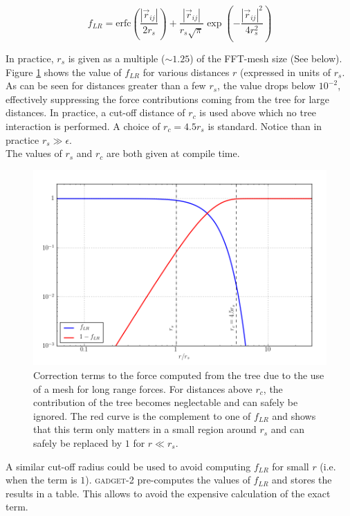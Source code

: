 \documentclass[a4paper,10pt]{report}
\newcommand{\gadget}{\textsc{gadget-2 }}
\begin{document}
\begin{equation}
 f_{LR} = \text{erfc}\left(\frac{|\vec{r}_{ij}|}{2r_s}\right) + \frac{|\vec{r}_{ij}|}{r_s\sqrt{\pi}}\exp\left(-\frac{|\vec{r}_{ij}|^2}{4r_s^2}\right)
\end{equation}

In practice, $r_s$ is given as a multiple ($\sim 1.25$) of the FFT-mesh size (See below). Figure \ref{fig:short_range_correction} shows the value of $f_{LR}$ for various distances $r$ (expressed in units of $r_s$.
As can be seen for distances greater than a few $r_s$, the value drops below $10^{-2}$, effectively suppressing the force contributions coming from the tree for large distances. In practice, a
cut-off distance of $r_c$ is used above which no tree interaction is performed. A choice of $r_c=4.5r_s$ is standard. Notice than in practice $r_s \gg \epsilon$.\\
The values of $r_s$ and $r_c$ are both given at compile time. \\

\begin{figure}
\centering
\includegraphics[width=\textwidth]{Figures/Gravity/correction}
\caption{Correction terms to the force computed from the tree due to the use of a mesh for long range forces. For distances above $r_c$, the contribution of the tree becomes neglectable and can safely be ignored.
The red curve is the complement to one of $f_{LR}$ and shows that this term only matters in a small region around $r_s$ and can safely be replaced by $1$ for $r\ll r_s$.} 
 \label{fig:short_range_correction}
\end{figure}

A similar cut-off radius could be used to avoid computing $f_{LR}$ for small $r$ (i.e. when the term is $1$). \gadget pre-computes the values of $f_{LR}$ and stores the results
in a table. This allows to avoid the expensive calculation of the exact term. \\
\end{document}
